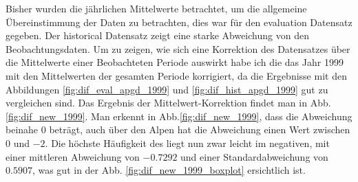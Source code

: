 Bisher wurden die jährlichen Mittelwerte betrachtet, um die allgemeine Übereinstimmung der Daten zu betrachten, dies war für den evaluation Datensatz gegeben. Der historical Datensatz zeigt eine starke Abweichung von den Beobachtungsdaten. Um zu zeigen, wie sich eine Korrektion des Datensatzes über die Mittelwerte einer Beobachteten Periode auswirkt habe ich die das Jahr 1999 mit den Mittelwerten der gesamten Periode korrigiert, da die Ergebnisse mit den Abbildungen \ref{fig:dif_eval_apgd_1999} und \ref{fig:dif_hist_apgd_1999} gut zu vergleichen sind.
Das Ergebnis der Mittelwert-Korrektion findet man in Abb. \ref{fig:dif_new_1999}. Man erkennt in Abb.\ref{fig:dif_new_1999}, dass die Abweichung beinahe $0$ beträgt, auch über den Alpen hat die Abweichung einen Wert zwischen $0$ und $-2$. Die höchste Häufigkeit des liegt nun zwar leicht im negativen, mit einer mittleren Abweichung von $-0.7292$ und einer Standardabweichung von $0.5907$, was gut in der Abb. \ref{fig:dif_new_1999_boxplot} ersichtlich ist.


